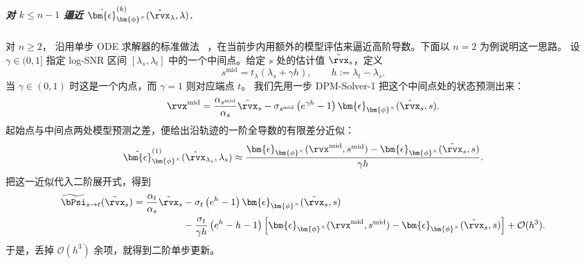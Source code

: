 \subparagraph{对 $k \leq n-1$ 逼近 {\color{cyan}$\hat{\bm{\epsilon}}_{\bm{\phi}^\times}^{(k)}(\hat\rvx_\lambda,\lambda)$}.}
对 $n \geq 2$，\citet{lu2022dpm} 沿用单步 ODE 求解器的标准做法
~\citep{atkinson2009numerical}，在当前步内用额外的模型评估来逼近高阶导数。下面以 $n=2$ 为例说明这一思路。
设 $\gamma\in(0,1]$ 指定 log-SNR 区间 $[\lambda_s,\lambda_t]$ 中的一个中间点。给定 $s$ 处的估计值 $\tilde\rvx_s$，定义
\[
s^{\mathrm{mid}}
=
t_\lambda\left(\lambda_s+\gamma h\right),
\qquad
h:=\lambda_t-\lambda_s.
\]
当 $\gamma\in(0,1)$ 时这是一个内点，而 $\gamma=1$ 则对应端点 $t$。
我们先用一步 DPM-Solver-1 把这个中间点处的状态预测出来：
\[
\rvx^{\mathrm{mid}}
=
\frac{\alpha_{s^{\mathrm{mid}}}}{\alpha_s}\tilde\rvx_s
-
\sigma_{s^{\mathrm{mid}}}
\left(e^{\gamma h}-1\right)
\bm{\epsilon}_{\bm{\phi}^\times}(\tilde\rvx_s,s).
\]
起始点与中间点两处模型预测之差，便给出沿轨迹的一阶全导数的有限差分近似：
\[
\hat{\bm{\epsilon}}_{\bm{\phi}^\times}^{(1)}
(\hat\rvx_{\lambda_s},\lambda_s)
\approx
\frac{
\bm{\epsilon}_{\bm{\phi}^\times}
(\rvx^{\mathrm{mid}},s^{\mathrm{mid}})
-
\bm{\epsilon}_{\bm{\phi}^\times}
(\tilde\rvx_s,s)
}{
\gamma h
}.
\]
把这一近似代入二阶展开式，得到
\begin{align}
\label{eq:dpm-solver-2-app}
\begin{aligned}
\widetilde\bPsi_{s\to t}(\tilde\rvx_s)
=
\frac{\alpha_t}{\alpha_s}\tilde\rvx_s
&-
\sigma_t
\left(e^h-1\right)
\bm{\epsilon}_{\bm{\phi}^\times}(\tilde\rvx_s,s)
\\
&-
\frac{\sigma_t}{\gamma h}
\left(e^h-h-1\right)
\left[
\bm{\epsilon}_{\bm{\phi}^\times}
(\rvx^{\mathrm{mid}},s^{\mathrm{mid}})
-
\bm{\epsilon}_{\bm{\phi}^\times}
(\tilde\rvx_s,s)
\right]
+
\mathcal O(h^3).
\end{aligned}
\end{align}
于是，丢掉 $\mathcal O(h^3)$ 余项，就得到二阶单步更新。

